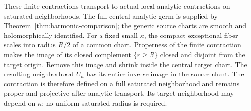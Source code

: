 These finite contractions transport to actual local analytic
contractions on saturated neighborhoods. The full central analytic
germ is supplied by Theorem~\ref{thm:harmonic-comparison}; the
generic source charts are smooth and holomorphically identified.
For a fixed small $\kappa$, the compact exceptional fiber scales
into radius $R/2$ of a common chart. Properness of the finite
contraction makes the image of its closed complement $\{r\ge R\}$
closed and disjoint from the target origin.
Remove this image and shrink inside the central target chart.
The resulting neighborhood $U_\kappa$ has its entire inverse image
in the source chart. The contraction is therefore defined on a
full saturated neighborhood and remains proper and projective
after analytic transport. Its target neighborhood may depend on
$\kappa$; no uniform saturated radius is required.

